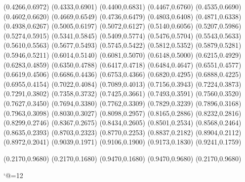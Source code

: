 (0.4266,0.6972)                                       
(0.4333,0.6901)                                       
(0.4400,0.6831)                                       
(0.4467,0.6760)                                       
(0.4535,0.6690)                                       
(0.4602,0.6620)                                       
(0.4669,0.6549)                                       
(0.4736,0.6479)                                       
(0.4803,0.6408)                                       
(0.4871,0.6338)                                       
(0.4938,0.6267)                                       
(0.5005,0.6197)                                       
(0.5072,0.6127)                                       
(0.5140,0.6056)                                       
(0.5207,0.5986)                                       
(0.5274,0.5915)                                       
(0.5341,0.5845)                                       
(0.5409,0.5774)                                       
(0.5476,0.5704)                                       
(0.5543,0.5633)                                       
(0.5610,0.5563)                                       
(0.5677,0.5493)                                       
(0.5745,0.5422)                                       
(0.5812,0.5352)                                       
(0.5879,0.5281)                                       
(0.5946,0.5211)                                       
(0.6014,0.5140)                                       
(0.6081,0.5070)                                       
(0.6148,0.5000)                                       
(0.6215,0.4929)                                       
(0.6283,0.4859)                                       
(0.6350,0.4788)                                       
(0.6417,0.4718)                                       
(0.6484,0.4647)                                       
(0.6551,0.4577)                                       
(0.6619,0.4506)                                       
(0.6686,0.4436)                                       
(0.6753,0.4366)                                       
(0.6820,0.4295)                                       
(0.6888,0.4225)                                       
(0.6955,0.4154)                                       
(0.7022,0.4084)                                       
(0.7089,0.4013)                                       
(0.7156,0.3943)                                       
(0.7224,0.3873)                                       
(0.7291,0.3802)                                       
(0.7358,0.3732)                                       
(0.7425,0.3661)                                       
(0.7493,0.3591)                                       
(0.7560,0.3520)
(0.7627,0.3450)
(0.7694,0.3380)
(0.7762,0.3309)
(0.7829,0.3239)
(0.7896,0.3168)
(0.7963,0.3098)
(0.8030,0.3027)
(0.8098,0.2957)
(0.8165,0.2886)
(0.8232,0.2816)
(0.8299,0.2746)
(0.8367,0.2675)
(0.8434,0.2605)
(0.8501,0.2534)
(0.8568,0.2464)
(0.8635,0.2393)
(0.8703,0.2323)
(0.8770,0.2253)
(0.8837,0.2182)
(0.8904,0.2112)
(0.8972,0.2041)
(0.9039,0.1971)
(0.9106,0.1900)
(0.9173,0.1830)
(0.9241,0.1759)

\PST@Border(0.2170,0.9680)
(0.2170,0.1680)
(0.9470,0.1680)
(0.9470,0.9680)
(0.2170,0.9680)

\catcode`@=12
\fi
\endpspicture
